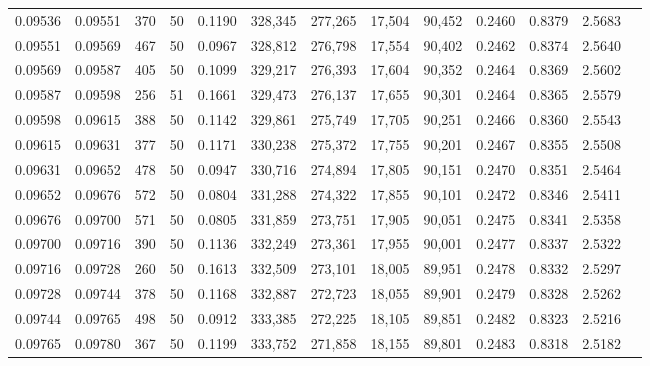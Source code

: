 \begin{tabular}{rrrrrrrrrrrrr}
0.09536 & 0.09551 &   370 &  50 &                                     0.1190 & 328,345 & 277,265 &  17,504 &  90,452 & 0.2460 & 0.8379 & 2.5683 \\
0.09551 & 0.09569 &   467 &  50 &                                     0.0967 & 328,812 & 276,798 &  17,554 &  90,402 & 0.2462 & 0.8374 & 2.5640 \\
0.09569 & 0.09587 &   405 &  50 &                                     0.1099 & 329,217 & 276,393 &  17,604 &  90,352 & 0.2464 & 0.8369 & 2.5602 \\
0.09587 & 0.09598 &   256 &  51 &                                     0.1661 & 329,473 & 276,137 &  17,655 &  90,301 & 0.2464 & 0.8365 & 2.5579 \\
0.09598 & 0.09615 &   388 &  50 &                                     0.1142 & 329,861 & 275,749 &  17,705 &  90,251 & 0.2466 & 0.8360 & 2.5543 \\
0.09615 & 0.09631 &   377 &  50 &                                     0.1171 & 330,238 & 275,372 &  17,755 &  90,201 & 0.2467 & 0.8355 & 2.5508 \\
0.09631 & 0.09652 &   478 &  50 &                                     0.0947 & 330,716 & 274,894 &  17,805 &  90,151 & 0.2470 & 0.8351 & 2.5464 \\
0.09652 & 0.09676 &   572 &  50 &                                     0.0804 & 331,288 & 274,322 &  17,855 &  90,101 & 0.2472 & 0.8346 & 2.5411 \\
0.09676 & 0.09700 &   571 &  50 &                                     0.0805 & 331,859 & 273,751 &  17,905 &  90,051 & 0.2475 & 0.8341 & 2.5358 \\
0.09700 & 0.09716 &   390 &  50 &                                     0.1136 & 332,249 & 273,361 &  17,955 &  90,001 & 0.2477 & 0.8337 & 2.5322 \\
0.09716 & 0.09728 &   260 &  50 &                                     0.1613 & 332,509 & 273,101 &  18,005 &  89,951 & 0.2478 & 0.8332 & 2.5297 \\
0.09728 & 0.09744 &   378 &  50 &                                     0.1168 & 332,887 & 272,723 &  18,055 &  89,901 & 0.2479 & 0.8328 & 2.5262 \\
0.09744 & 0.09765 &   498 &  50 &                                     0.0912 & 333,385 & 272,225 &  18,105 &  89,851 & 0.2482 & 0.8323 & 2.5216 \\
0.09765 & 0.09780 &   367 &  50 &                                     0.1199 & 333,752 & 271,858 &  18,155 &  89,801 & 0.2483 & 0.8318 & 2.5182 \\

\end{tabular}

